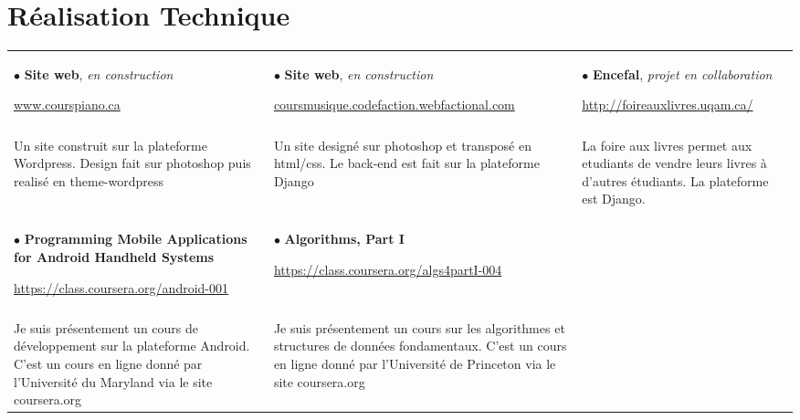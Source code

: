 \documentclass[a4paper,9pt]{extarticle}
\begin{document}
\section{Réalisation Technique}

\begin{tabular*}{\linewidth}{  
                   p{ } 
                   p{ }  
                   p{ } 
                   } 
$\bullet$ \textbf{Site web}, \textsl{en construction} \par  \href{www.courspiano.ca}{www.courspiano.ca} 

&$\bullet$ \textbf{Site web}, \textsl{en construction} \par \small\href{http://coursmusique.codefaction.webfactional.com}{coursmusique.codefaction.webfactional.com}
&$\bullet$ \textbf{Encefal}, \textsl{projet en collaboration} \par \href{http://foireauxlivres.uqam.ca/}{http://foireauxlivres.uqam.ca/} \tabularnewline \\


\vspace{-1.4em}Un site construit sur la plateforme Wordpress. Design fait sur photoshop puis realisé en theme-wordpress
& \vspace{-1.5em} Un site designé sur photoshop et transposé en html/css. Le back-end est fait sur la plateforme Django  
&\vspace{-1.5em} La foire aux livres permet aux etudiants de vendre leurs livres à d'autres étudiants. La plateforme est Django. 
\tabularnewline \\

$\bullet$ \textbf{Programming Mobile Applications for Android Handheld Systems} \par \small \href{https://class.coursera.org/android-001}{https://class.coursera.org/android-001}


&$\bullet$ \textbf{Algorithms, Part I} \par \small \href{https://class.coursera.org/algs4partI-004}{https://class.coursera.org/algs4partI-004} 


& \tabularnewline \\
\vspace{-1.5em} Je suis présentement un cours de développement sur la plateforme Android. C'est un cours en ligne donné par l'Université du Maryland via le site coursera.org

& \vspace{-1.5em} Je suis présentement un cours sur les algorithmes et structures de données fondamentaux. C'est un cours en ligne donné par l'Université de Princeton via le site coursera.org



\end{tabular*}   
\end{document}
